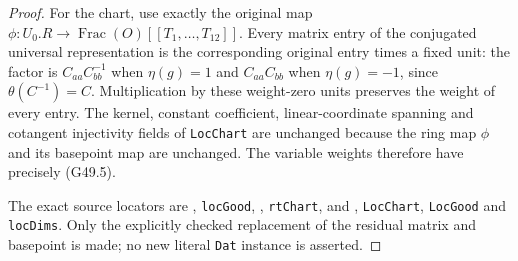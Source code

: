 \begin{proof}
For the chart, use exactly the original map
$\phi:U_0.R\to\operatorname{Frac}(O)[[T_1,\ldots,T_{12}]]$.
Every matrix entry of the conjugated universal representation
is the corresponding original entry times a fixed unit:
the factor is $C_{aa}C_{bb}^{-1}$ when $\eta(g)=1$ and
$C_{aa}C_{bb}$ when $\eta(g)=-1$, since
$\theta(C^{-1})=C$.
Multiplication by these weight-zero units preserves the
weight of every entry.  The kernel, constant coefficient,
linear-coordinate spanning and cotangent injectivity fields
of \texttt{LocChart} are unchanged because the ring map
$\phi$ and its basepoint map are unchanged.  The variable
weights therefore have precisely (G49.5).

The exact source locators are
, \texttt{locGood},
, \texttt{rtChart}, and
,
\texttt{LocChart}, \texttt{LocGood} and \texttt{locDims}.
Only the explicitly checked replacement of the residual
matrix and basepoint is made; no new literal \texttt{Dat}
instance is asserted.
\end{proof}

